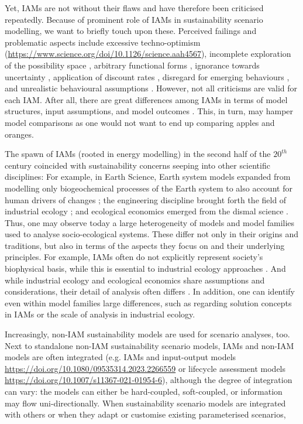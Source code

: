 \documentclass{article}
\begin{document}
\begin{refsection}
Yet, IAMs are not without their flaws and have therefore been criticised repeatedly. 
Because of prominent role of IAMs in sustainability scenario modelling, we want to briefly touch upon these. 
Perceived failings and problematic aspects include excessive techno-optimism (\url{https://www.science.org/doi/10.1126/science.aah4567}), incomplete exploration of the possibility space \parencite{keppo_2021,mccollum_2020, gambhir_2022}, arbitrary functional forms \parencite{pindyck_2017}, ignorance towards uncertainty \parencite{stern_2016}, application of discount rates \parencite{emmerling_2019}, disregard for emerging behaviours \parencite{farmer_2015}, and unrealistic behavioural assumptions \parencite{asefi_2021}. 
However, not all criticisms are valid for each IAM. 
After all, there are great differences among IAMs in terms of model structures, input assumptions, and model outcomes \parencite{krey_2014,krey_2019,hiroto_2020,keppo_2021}. 
This, in turn, may hamper model comparisons \parencite{giarola_2021,sognnaes_2021} as one would not want to end up comparing apples and oranges.

The spawn of IAMs (rooted in energy modelling) in the second half of the ${20}^{th}$ century coincided with sustainability concerns seeping into other scientific disciplines: 
For example, in Earth Science, Earth system models expanded from modelling only biogeochemical processes of the Earth system to also account for human drivers of changes \parencite{flato_2011}; 
the engineering discipline brought forth the field of industrial ecology \parencite{frosch_1989,ausubel_1992,jelinski_1992}; 
and ecological economics emerged from the dismal science \parencite{cleveland_1999}. 
Thus, one may observe today a large heterogeneity of models and model families used to analyse socio-ecological systems. 
These differ not only in their origins and traditions, but also in terms of the aspects they focus on and their underlying principles. 
For example, IAMs often do not explicitly represent society's biophysical basis, while this is essential to industrial ecology approaches \parencite{pauliuk_2017}. 
And while industrial ecology and ecological economics share assumptions and considerations, their detail of analysis often differs \parencite{kronenberg_2006}. 
In addition, one can identify even within model families large differences, such as regarding solution concepts in IAMs or the scale of analysis in industrial ecology.

Increasingly, non-IAM sustainability models are used for scenario analyses, too. 
Next to standalone non-IAM sustainability scenario models, IAMs and non-IAM models are often integrated (e.g. IAMs and input-output models \url{https://doi.org/10.1080/09535314.2023.2266559} or lifecycle assessment models \url{https://doi.org/10.1007/s11367-021-01954-6}), although the degree of integration can vary: 
the models can either be hard-coupled, soft-coupled, or information may flow uni-directionally. 
When sustainability scenario models are integrated with others or when they adapt or customise existing parameterised scenarios, 


\end{refsection}
\end{document}
